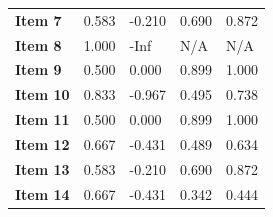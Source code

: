 \begin{table}[]
\begin{tabular}{lllll}
			\textbf{Item 7}  & 0.583                                                                                   & -0.210                                                                                 & 0.690                                       & 0.872                                 \\
			\textbf{Item 8}  & 1.000                                                                                   & -Inf                                                                                   & N/A                                         & N/A                                   \\
			\textbf{Item 9}  & 0.500                                                                                   & 0.000                                                                                  & 0.899                                       & 1.000                                 \\
			\textbf{Item 10} & 0.833                                                                                   & -0.967                                                                                 & 0.495                                       & 0.738                                 \\
			\textbf{Item 11} & 0.500                                                                                   & 0.000                                                                                  & 0.899                                       & 1.000                                 \\
			\textbf{Item 12} & 0.667                                                                                   & -0.431                                                                                 & 0.489                                       & 0.634                                 \\
			\textbf{Item 13} & 0.583                                                                                   & -0.210                                                                                 & 0.690                                       & 0.872                                 \\
			\textbf{Item 14} & 0.667                                                                                   & -0.431                                                                                 & 0.342                                       & 0.444\\                                
			\bottomrule
		\end{tabular}
	\end{table}
	
